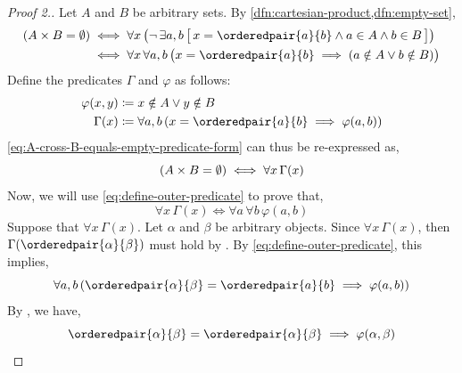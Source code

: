 \begin{proof}[Proof 2.]
    Let \( A \) and \( B \) be arbitrary sets. By \cref{dfn:cartesian-product,dfn:empty-set},
    \begin{align}
        \label{eq:A-cross-B-equals-empty-predicate-form}
        \mleft( A \times B = \emptyset \mright)
        &\iff
        \forall x \, \big( \lnot \, \exists a,b \, \big[\, x = \orderedpair{a}{b} \land a \in A \land b \in B \,\big] \big) \notag \\
        &\iff
        \forall x \, \forall a,b \, \big( x = \orderedpair{a}{b} \implies \mleft( a \notin A \lor b \notin B \mright) \big)
    \end{align}
    Define the predicates \( \Gamma \) and \( \varphi \) as follows:
    \begin{align}
        \varphi(x,y) &\coloneq x \notin A \lor y \notin B \label{eq:define-inner-predicate} \\
        \Gamma(x)    &\coloneq \forall a,b \, \mleft( x = \orderedpair{a}{b} \implies \varphi(a,b) \mright) \label{eq:define-outer-predicate}
    \end{align}
    \eqref{eq:A-cross-B-equals-empty-predicate-form} can thus be re-expressed as,
    \begin{equation}
        \label{eq:A-cross-B-equals-empty-predicate-expressed-in-terms-of-Gamma}
        \mleft( A \times B = \emptyset \mright) \iff \forall x \, \Gamma(x)
    \end{equation}
    Now, we will use \eqref{eq:define-outer-predicate} to prove that,
    \begin{equation*}
        \forall x \, \Gamma(x) \iff \forall a \, \forall b \, \varphi(a,b)
    \end{equation*}
    Suppose that \( \forall x \, \Gamma(x) \). Let \( \alpha \) and \( \beta \) be arbitrary objects. Since \( \forall x \, \Gamma(x) \),
    then \( \Gamma(\orderedpair{\alpha}{\beta}) \) must hold by . By \eqref{eq:define-outer-predicate},
    this implies,
    \begin{equation*}
        \forall a,b \, \mleft( \orderedpair{\alpha}{\beta} = \orderedpair{a}{b} \implies \varphi(a,b) \mright)
    \end{equation*}
    By , we have,
    \begin{equation*}
        \orderedpair{\alpha}{\beta} = \orderedpair{\alpha}{\beta} \implies \varphi(\alpha, \beta)

\end{equation*}
\end{proof}
